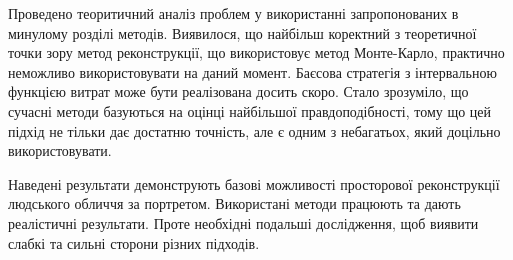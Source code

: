 \chapterConclusion

Проведено теоритичний аналіз проблем
у використанні запропонованих в минулому розділі методів.
Виявилося, що найбільш коректний з теоретичної точки зору
метод реконструкції, що використовує метод Монте-Карло,
практично неможливо використовувати на даний момент.
Баєсова стратегія з інтервальною функцією витрат
може бути реалізована досить скоро.
Стало зрозуміло, що сучасні методи базуються на
оцінці найбільшої правдоподібності,
тому що цей підхід не тільки дає достатню точність,
але є одним з небагатьох, який доцільно використовувати.

Наведені результати демонструють базові можливості
просторової реконструкції людського обличчя за портретом.
Використані методи працюють та дають реалістичні результати.
Проте необхідні подальші дослідження,
щоб виявити слабкі та сильні сторони різних підходів.
